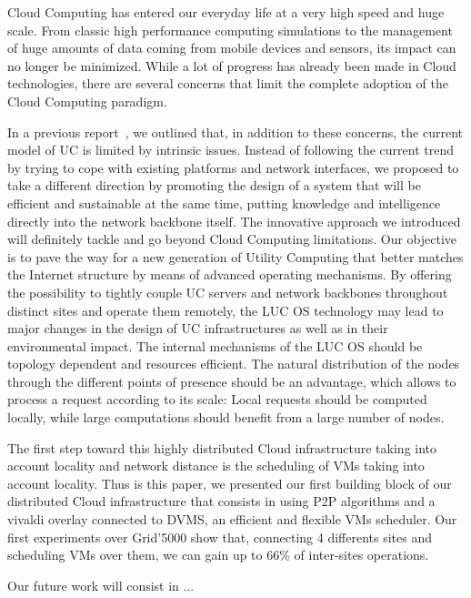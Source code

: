 
Cloud Computing has entered our everyday life at a very high speed and huge scale. From classic high performance computing simulations to the management of huge amounts of data coming from mobile devices and sensors, its impact can no longer be minimized. While a lot of progress has already been made in Cloud technologies, there are several concerns that limit the complete adoption of the Cloud Computing paradigm.

In a previous report~\cite{lebre:hal-00854204}, we outlined that, in addition to these concerns, the current model of UC is limited by intrinsic issues. Instead of following the current trend by trying to cope with existing platforms and network interfaces, we proposed to take a different direction by promoting the design of a system that will be efficient and sustainable at the same time, putting knowledge and intelligence directly into the network backbone itself. The innovative approach we introduced will definitely tackle and go beyond Cloud Computing limitations. Our objective is to pave the way for a new generation of Utility Computing that better matches the Internet structure by means of advanced operating mechanisms. By offering the possibility to tightly couple UC servers and network backbones throughout distinct sites and operate them remotely, the LUC OS technology may lead to major changes in the design of UC infrastructures as well as in their environmental impact. The internal mechanisms of the LUC OS should be topology dependent and resources efficient. The natural distribution of the nodes through the different points of presence should be an advantage, which allows to process a request according to its scale: Local requests should be computed locally, while large computations should benefit from a large number of nodes.

The first step toward this highly distributed Cloud infrastructure taking into account locality and network distance is the scheduling of VMs taking into account locality. Thus is this paper, we presented our first building block of our distributed Cloud infrastructure that consists in using P2P algorithms and a vivaldi overlay connected to DVMS, an efficient and flexible VMs scheduler. Our first experiments over Grid'5000 show that, connecting 4 differents sites and scheduling VMs over them, we can gain up to 66\% of inter-sites operations. 

Our future work will consist in ... 